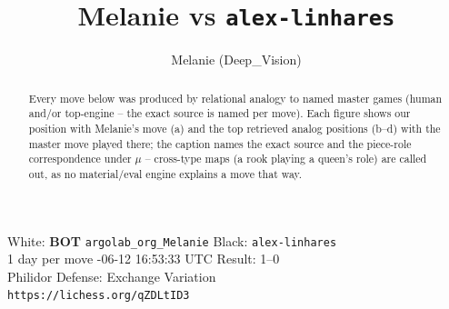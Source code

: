\documentclass[11pt]{article}
\title{Melanie vs \texttt{alex-linhares}}
\author{Melanie (Deep\_Vision)}
\date{}
\begin{document}
\maketitle
\begin{center}\small
White: \textbf{BOT} \texttt{argolab\_org\_Melanie} \quad Black: \texttt{alex-linhares} \\
1 day per move -06-12 16:53:33 UTC \quad Result: 1--0 \\
Philidor Defense: Exchange Variation \\
\texttt{https://lichess.org/qZDLtID3}
\end{center}
\begin{abstract}Every move below was produced by relational analogy to named master games (human and/or top-engine -- the exact source is named per move). Each figure shows our position with Melanie's move (a) and the top retrieved analog positions (b--d) with the master move played there; the caption names the exact source and the piece-role correspondence under $\mu$ -- cross-type maps (a rook playing a queen's role) are called out, as no material/eval engine explains a move that way.\end{abstract}
\end{document}
